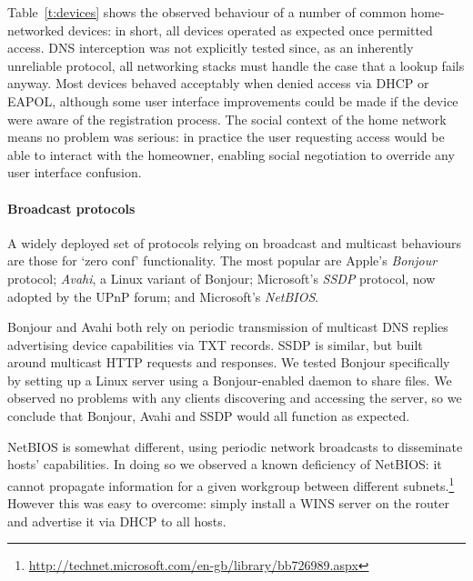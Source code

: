 Table~\ref{t:devices} shows the observed behaviour of a number of
common home-networked devices: in short, all devices operated as
expected once permitted access.  DNS interception was not explicitly
tested since, as an inherently unreliable protocol, all networking stacks must
handle the case that a lookup fails anyway.  Most devices behaved acceptably
when denied access via DHCP or EAPOL, although some user interface
improvements could be made if the device were aware of the
registration process.  The social context of the home network means no
problem was serious: in practice the user requesting access would be
able to interact with the homeowner, enabling social negotiation to
override any user interface confusion. 


\paragraph{Broadcast protocols}
A widely deployed set of protocols relying on broadcast and multicast
behaviours are those for `zero conf' functionality.  The most
popular are Apple's \emph{Bonjour} protocol; \emph{Avahi}, a Linux
variant of Bonjour; Microsoft's \emph{SSDP} protocol, now adopted by
the UPnP forum; and Microsoft's \emph{NetBIOS}.  

Bonjour and Avahi both rely on periodic transmission of multicast DNS
replies advertising device capabilities via TXT records.  SSDP is
similar, but built around multicast HTTP requests and responses.  We
tested Bonjour specifically by setting up a Linux server using a
Bonjour-enabled daemon to share files.  We observed no
problems with any clients discovering and accessing the server, so we
conclude that Bonjour, Avahi and SSDP would all function as expected. 

NetBIOS is somewhat different, using periodic network broadcasts to
disseminate hosts' capabilities.  In doing so we observed a known
deficiency of NetBIOS: it cannot propagate information for a given
workgroup between different
subnets.\footnote{\url{http://technet.microsoft.com/en-gb/library/bb726989.aspx}}
However this was easy to overcome: simply install a WINS server on the
router and advertise it via DHCP to all hosts.

